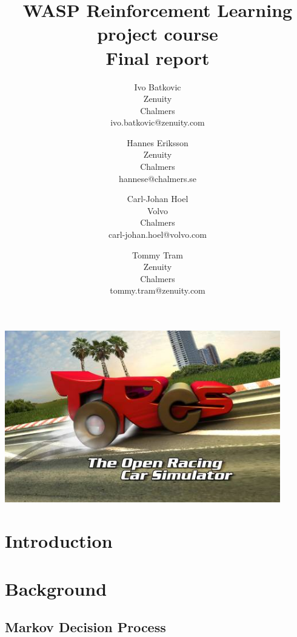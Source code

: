 \documentclass{article}
\begin{document}
\title{WASP Reinforcement Learning project course \\
	Final report}
\author{
	Ivo Batkovic\\
	Zenuity\\
	Chalmers\\
	ivo.batkovic@zenuity.com
	\and
	Hannes Eriksson\\
	Zenuity\\
	Chalmers\\
	hannese@chalmers.se
	\and
	Carl-Johan Hoel\\
	Volvo\\
	Chalmers\\
	carl-johan.hoel@volvo.com
	\and
	Tommy Tram\\
	Zenuity\\
	Chalmers\\
	tommy.tram@zenuity.com
}

\maketitle
\thispagestyle{empty}
\includegraphics[width=12cm]{img/torcs.png} %
\clearpage
\tableofcontents
\thispagestyle{empty}
\clearpage
\section{Introduction}
\setcounter{page}{1}

\section{Background}

\subsection{Markov Decision Process}
\end{document}
